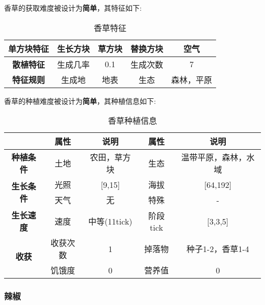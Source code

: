 香草的获取难度被设计为\textbf{简单}，其特征如下:
\begin{table}[H]
    \centering
    \caption{香草特征}
    \label{table:香草特征}
    \setlength{\tabcolsep}{4mm}
    \begin{tabular}{c|cc|cc}
        \toprule
        \textbf{单方块特征} & 生长方块 & 草方块 & 替换方块 & 空气 \\
        \midrule
        \textbf{散植特征} & 生成几率 & 0.1 & 生成次数 & 7 \\
        \midrule
        \textbf{特征规则} & 生成地 & 地表 & 生态 & 森林，平原 \\
        \bottomrule
    \end{tabular}
\end{table}


香草的种植难度被设计为\textbf{简单}，其种植信息如下:

\begin{table}[H]
    \centering
    \caption{香草种植信息}
    \label{table:香草种植信息}
    \setlength{\tabcolsep}{4mm}
    \begin{tabular}{c|cc|cc}
        \toprule
                                           & \textbf{属性} & \textbf{说明} & \textbf{属性} & \textbf{说明}        \\
        \midrule
        \textbf{种植条件}                  & 土地          & 农田，草方块    & 生态          & 温带平原，森林，水域 \\
        \midrule
        \multirow{2}{*}{\textbf{生长条件}} & 光照          & [9,15]        & 海拔          & [64,192]               \\
                                           & 天气          & 无            & 特殊          & -             \\
        \midrule
        \textbf{生长速度}                  & 速度          & 中等(11tick)    & 阶段tick      & [3,3,5]              \\
        \midrule
        \multirow{2}{*}{\textbf{收获}}     & 收获次数      & 1             & 掉落物        & 种子1-2，香草1-4     \\
                                           & 饥饿度        & 0             & 营养值        & 0                    \\
        \bottomrule
    \end{tabular}
\end{table}

\subsubsection{辣椒}

